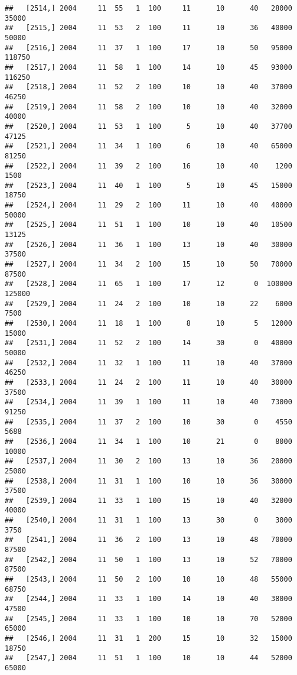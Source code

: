 \documentclass{article}\usepackage[]{graphicx}\usepackage[]{color}
\makeatletter
\newenvironment{kframe}{%
 \def\at@end@of@kframe{}%
 \ifinner\ifhmode%
  \def\at@end@of@kframe{\end{minipage}}%
  \begin{minipage}{\columnwidth}%
 \fi\fi%
 \def\FrameCommand##1{\hskip\@totalleftmargin \hskip-\fboxsep
 \colorbox{shadecolor}{##1}\hskip-\fboxsep
     \hskip-\linewidth \hskip-\@totalleftmargin \hskip\columnwidth}%
 \MakeFramed {\advance\hsize-\width
   \@totalleftmargin\z@ \linewidth\hsize
   \@setminipage}}%
 {\par\unskip\endMakeFramed%
 \at@end@of@kframe}
\newenvironment{knitrout}{}{} %
\makeatother
\begin{document}
\begin{knitrout}
\begin{kframe}
\begin{verbatim}
##   [2514,] 2004     11  55   1  100     11      10      40   28000   35000
##   [2515,] 2004     11  53   2  100     11      10      36   40000   50000
##   [2516,] 2004     11  37   1  100     17      10      50   95000  118750
##   [2517,] 2004     11  58   1  100     14      10      45   93000  116250
##   [2518,] 2004     11  52   2  100     10      10      40   37000   46250
##   [2519,] 2004     11  58   2  100     10      10      40   32000   40000
##   [2520,] 2004     11  53   1  100      5      10      40   37700   47125
##   [2521,] 2004     11  34   1  100      6      10      40   65000   81250
##   [2522,] 2004     11  39   2  100     16      10      40    1200    1500
##   [2523,] 2004     11  40   1  100      5      10      45   15000   18750
##   [2524,] 2004     11  29   2  100     11      10      40   40000   50000
##   [2525,] 2004     11  51   1  100     10      10      40   10500   13125
##   [2526,] 2004     11  36   1  100     13      10      40   30000   37500
##   [2527,] 2004     11  34   2  100     15      10      50   70000   87500
##   [2528,] 2004     11  65   1  100     17      12       0  100000  125000
##   [2529,] 2004     11  24   2  100     10      10      22    6000    7500
##   [2530,] 2004     11  18   1  100      8      10       5   12000   15000
##   [2531,] 2004     11  52   2  100     14      30       0   40000   50000
##   [2532,] 2004     11  32   1  100     11      10      40   37000   46250
##   [2533,] 2004     11  24   2  100     11      10      40   30000   37500
##   [2534,] 2004     11  39   1  100     11      10      40   73000   91250
##   [2535,] 2004     11  37   2  100     10      30       0    4550    5688
##   [2536,] 2004     11  34   1  100     10      21       0    8000   10000
##   [2537,] 2004     11  30   2  100     13      10      36   20000   25000
##   [2538,] 2004     11  31   1  100     10      10      36   30000   37500
##   [2539,] 2004     11  33   1  100     15      10      40   32000   40000
##   [2540,] 2004     11  31   1  100     13      30       0    3000    3750
##   [2541,] 2004     11  36   2  100     13      10      48   70000   87500
##   [2542,] 2004     11  50   1  100     13      10      52   70000   87500
##   [2543,] 2004     11  50   2  100     10      10      48   55000   68750
##   [2544,] 2004     11  33   1  100     14      10      40   38000   47500
##   [2545,] 2004     11  33   1  100     10      10      70   52000   65000
##   [2546,] 2004     11  31   1  200     15      10      32   15000   18750
##   [2547,] 2004     11  51   1  100     10      10      44   52000   65000

\end{verbatim}
\end{kframe}
\end{knitrout}
\end{document}
